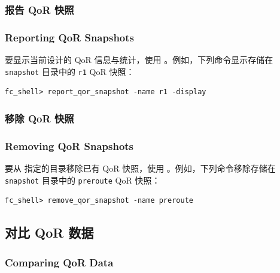 \subsubsection{报告 QoR 快照}
\subsubsection*{Reporting QoR Snapshots}

要显示当前设计的 QoR 信息与统计，使用 。例如，下列命令显示存储在 \texttt{snapshot} 目录中的 \texttt{r1} QoR 快照：
\begin{lstlisting}
fc_shell> report_qor_snapshot -name r1 -display
\end{lstlisting}

\subsubsection{移除 QoR 快照}
\subsubsection*{Removing QoR Snapshots}

要从  指定的目录移除已有 QoR 快照，使用 。例如，下列命令移除存储在 \texttt{snapshot} 目录中的 \texttt{preroute} QoR 快照：
\begin{lstlisting}
fc_shell> remove_qor_snapshot -name preroute
\end{lstlisting}

\subsection{对比 QoR 数据}
\subsubsection*{Comparing QoR Data}

